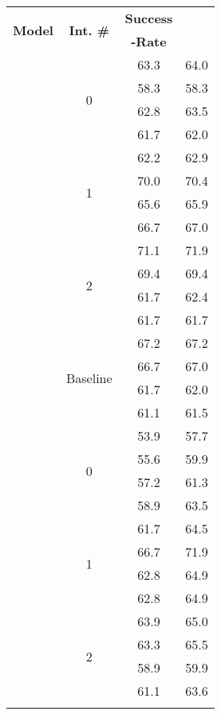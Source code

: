 \begin{table}
\centering
  \small
  \begin{tabular}{|c| c c c|}
    \toprule
    \multirow{2}{*}{\textbf{Model}} & \multirow{2}{*}{\textbf{Int. \#}} & \textbf{Success{}} & \multirow{2}{*}{\textbf{\precision{}}} \\
     &  & \textbf{-Rate{}} &  \\
    
    \midrule
    \multirow{16}{*}{\qwen{}} & \multirow{4}{*}{0} & 63.3 & 64.0 \\
     & & 58.3 & 58.3 \\
     & & 62.8 & 63.5 \\
     & & 61.7 & 62.0 \\
    \cline{2-4}
    
     & \multirow{4}{*}{1} & 62.2 & 62.9 \\
     & & 70.0 & 70.4 \\
     & & 65.6 & 65.9 \\
     & & 66.7 & 67.0 \\
    \cline{2-4}
    
     & \multirow{4}{*}{2} & 71.1 & 71.9 \\
     & & 69.4 & 69.4 \\
     & & 61.7 & 62.4 \\
     & & 61.7 & 61.7 \\
    \cline{2-4}
    
     & \multirow{4}{*}{Baseline} & 67.2 & 67.2 \\
     & & 66.7 & 67.0 \\
     & & 61.7 & 62.0 \\
     & & 61.1 & 61.5 \\
    
    \midrule
    \multirow{16}{*}{\llama{}} & \multirow{4}{*}{0} & 53.9 & 57.7 \\
     & & 55.6 & 59.9 \\
     & & 57.2 & 61.3 \\
     & & 58.9 & 63.5 \\
    \cline{2-4}
    
     & \multirow{4}{*}{1} & 61.7 & 64.5 \\
     & & 66.7 & 71.9 \\
     & & 62.8 & 64.9 \\
     & & 62.8 & 64.9 \\
    \cline{2-4}
    
     & \multirow{4}{*}{2} & 63.9 & 65.0 \\
     & & 63.3 & 65.5 \\
     & & 58.9 & 59.9 \\
     & & 61.1 & 63.6 \\
    \cline{2-4}
    

\end{tabular}
\end{table}
